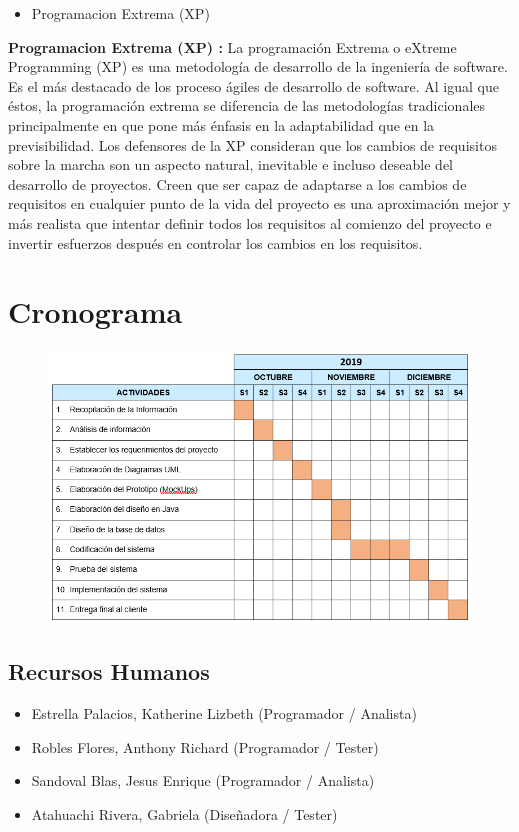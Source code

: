 \documentclass[preprint,12pt]{elsarticle}
\begin{document}
	\begin{itemize}
    \item Programacion Extrema (XP) 

	\end{itemize}
	
	\textbf{Programacion Extrema (XP) :} La programación Extrema o eXtreme Programming (XP) es una metodología de desarrollo de la ingeniería de software. Es el más destacado de los proceso ágiles de desarrollo de software. Al igual que éstos, la programación extrema se diferencia de las metodologías tradicionales principalmente en que pone más énfasis en la adaptabilidad que en la previsibilidad. Los defensores de la XP consideran que los cambios de requisitos sobre la marcha son un aspecto natural, inevitable e incluso deseable del desarrollo de proyectos. Creen que ser capaz de adaptarse a los cambios de requisitos en cualquier punto de la vida del proyecto es una aproximación mejor y más realista que intentar definir todos los requisitos al comienzo del proyecto e invertir esfuerzos después en controlar los cambios en los requisitos.
		


\section{Cronograma}
\begin{figure}[htb]
	\begin{center}
		\includegraphics[width=12cm]{./IMAGENES/cronograma} 
	\end{center}
\end{figure}

\subsection{\textbf{Recursos Humanos}}
\begin{itemize}
	\item Estrella Palacios, Katherine Lizbeth (Programador / Analista)
	\item Robles Flores, Anthony Richard (Programador / Tester)
	\item Sandoval Blas, Jesus Enrique (Programador / Analista)
	\item Atahuachi Rivera, Gabriela  (Diseñadora / Tester)
\end{itemize}
\end{document}
